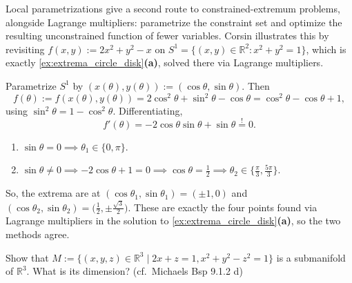 \begin{remark}
Local parametrizations give a second route to constrained-extremum problems, alongside Lagrange
multipliers: parametrize the constraint set and optimize the resulting unconstrained function of
fewer variables. Corsin illustrates this by revisiting $f(x,y) := 2x^2+y^2-x$ on
$S^1 = \{(x,y)\in\mathbb{R}^2 : x^2+y^2=1\}$, which is exactly \cref{ex:extrema_circle_disk}\textbf{(a)}, solved
there via Lagrange multipliers.

Parametrize $S^1$ by $(x(\theta),y(\theta)) := (\cos\theta,\sin\theta)$. Then
\[f(\theta) := f(x(\theta),y(\theta)) = 2\cos^2\theta+\sin^2\theta-\cos\theta = \cos^2\theta-\cos\theta+1,\]
using $\sin^2\theta = 1-\cos^2\theta$. Differentiating,
\[f'(\theta) = -2\cos\theta\sin\theta+\sin\theta \overset{!}{=} 0.\]
\begin{enumerate}[label=\textbf{(\alph*)}]
  \item $\sin\theta = 0 \implies \theta_1 \in \{0,\pi\}$.
  \item $\sin\theta \neq 0 \implies -2\cos\theta+1=0 \implies \cos\theta = \tfrac12 \implies
    \theta_2 \in \{\tfrac{\pi}{3},\tfrac{5\pi}{3}\}$.
\end{enumerate}
So, the extrema are at $(\cos\theta_1,\sin\theta_1) = (\pm1,0)$ and
$(\cos\theta_2,\sin\theta_2) = \big(\tfrac12,\pm\tfrac{\sqrt3}{2}\big)$. These are exactly the
four points found via Lagrange multipliers in the solution to \cref{ex:extrema_circle_disk}\textbf{(a)}, so the
two methods agree.
\end{remark}

\begin{exercise}
\label{ex:dimension_submanifold_system}
Show that $M := \{(x,y,z) \in \mathbb{R}^3 \mid 2x+z=1, x^2+y^2-z^2=1\}$ is a submanifold of $\mathbb{R}^3$. What is its dimension? (cf.\ Michaels Bsp 9.1.2 d)
\end{exercise}

